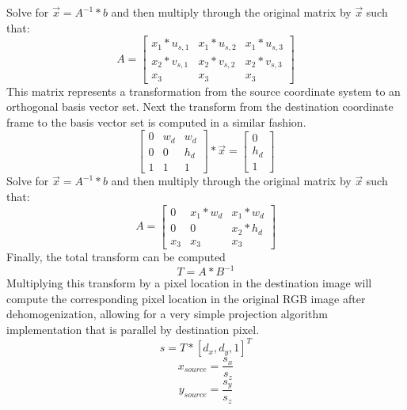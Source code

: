 Solve for $\vec{x}= A^{-1}*b$ and then multiply through the original matrix by $\vec{x}$ such that:
$$A = \begin{bmatrix}
  x_1*u_{s,1} & x_1*u_{s,2} & x_1*u_{s,3} \\
  x_2*v_{s,1} & x_2*v_{s,2} & x_2*v_{s,3} \\
  x_3 & x_3 & x_3 
 \end{bmatrix}$$
This matrix represents a transformation from the source coordinate system to an orthogonal basis vector set. Next the transform from the destination coordinate frame to the basis vector set is computed in a similar fashion.
$$\begin{bmatrix}
  0 & w_d & w_d \\
  0 & 0 & h_d \\
  1 & 1 & 1 
 \end{bmatrix} * \vec{x} = \begin{bmatrix}
  0 \\
  h_d \\
  1
 \end{bmatrix}$$
Solve for $\vec{x}= A^{-1}*b$ and then multiply through the original matrix by $\vec{x}$ such that:
$$A = \begin{bmatrix}
  0 & x_1*w_d & x_1*w_d \\
  0 & 0 & x_2*h_d \\
  x_3 & x_3 & x_3 
 \end{bmatrix}$$
Finally, the total transform can be computed $$T=A*B^{-1}$$
Multiplying this transform by a pixel location in the destination image will compute the corresponding pixel location in the original RGB image after dehomogenization, allowing for a very simple projection algorithm implementation that is parallel by destination pixel.
$$s = T*[d_x,d_y,1]^T$$
$$x_{source} = \frac{s_x}{s_z}$$
$$y_{source} = \frac{s_y}{s_z}$$


